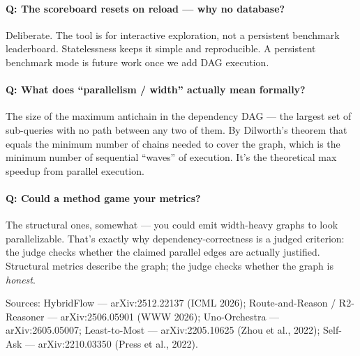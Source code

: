 \documentclass[11pt]{article}
\begin{document}
\paragraph{Q: The scoreboard resets on reload --- why no database?}
Deliberate. The tool is for interactive exploration, not a persistent benchmark
leaderboard. Statelessness keeps it simple and reproducible. A persistent
benchmark mode is future work once we add DAG execution.

\paragraph{Q: What does ``parallelism / width'' actually mean formally?}
The size of the maximum antichain in the dependency DAG --- the largest set of
sub-queries with no path between any two of them. By Dilworth's theorem that
equals the minimum number of chains needed to cover the graph, which is the
minimum number of sequential ``waves'' of execution. It's the theoretical max
speedup from parallel execution.

\paragraph{Q: Could a method game your metrics?}
The structural ones, somewhat --- you could emit width-heavy graphs to look
parallelizable. That's exactly why dependency-correctness is a judged criterion:
the judge checks whether the claimed parallel edges are actually justified.
Structural metrics describe the graph; the judge checks whether the graph is
\emph{honest}.

\vfill
\hrulefill

\noindent\footnotesize
Sources: HybridFlow --- arXiv:2512.22137 (ICML 2026);
Route-and-Reason / R2-Reasoner --- arXiv:2506.05901 (WWW 2026);
Uno-Orchestra --- arXiv:2605.05007;
Least-to-Most --- arXiv:2205.10625 (Zhou et al., 2022);
Self-Ask --- arXiv:2210.03350 (Press et al., 2022).
\end{document}
